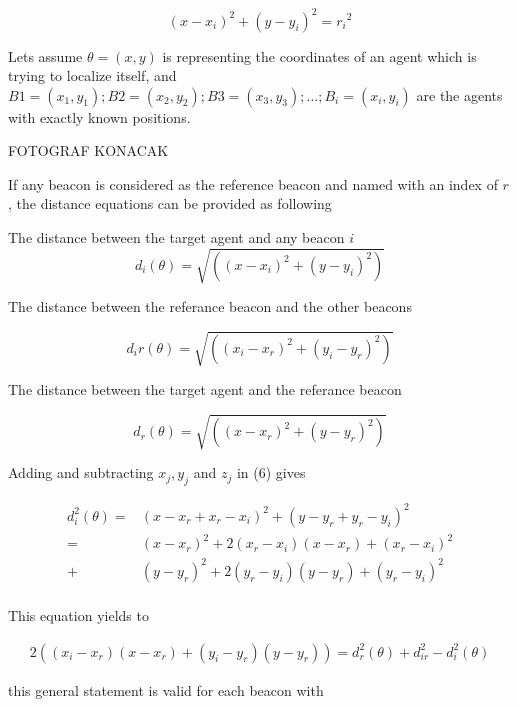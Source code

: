 \documentclass[twoside]{article}
\begin{document}
\begin{equation}
  (x-x_i)^2 + (y - y_i)^2 = {r_i}^2
\end{equation}

Lets assume $\theta = (x,y)$ is representing the coordinates of an agent which is trying to localize itself, and $B1 = (x_1,y_1) ; B2 = (x_2,y_2) ; B3 = (x_3,y_3) ; ...  ; B_i = (x_i,y_i)$ are the agents with exactly known positions. 


FOTOGRAF KONACAK

If any beacon is considered as the reference beacon and named with an index of $r$, the distance equations can be provided as following 

The distance between the target agent and any beacon $i$
\begin{equation}
  d_i(\theta) = \sqrt{\left((x - x_i)^2 + (y - y_i)^2\right)}
\end{equation}

The distance between the referance beacon and the other beacons

\begin{equation}
d_ir(\theta) = \sqrt{\left((x_i - x_r)^2 + (y_i - y_r)^2\right)}
\end{equation}

The distance between the target agent and the referance beacon

\begin{equation}
d_r(\theta) = \sqrt{\left((x - x_r)^2 + (y - y_r)^2\right)}
\end{equation}

Adding and subtracting $x_j, y_j$ and $z_j$ in (6) gives

\begin{align*}
d_i^2(\theta) = & (x - x_r + x_r - x_i)^2 + (y - y_r + y_r - y_i)^2 \\
              = & (x - x_r)^2 + 2(x_r - x_i)(x - x_r) + (x_r-x_i)^2 \\ 
              + & (y - y_r)^2 + 2(y_r - y_i)(y - y_r) + (y_r - y_i)^2 \\               
\end{align*}


This equation yields to

\begin{align*}
 2((x_i - x_r)(x - x_r) + (y_i - y_r)(y - y_r)) = d_r^2(\theta) + d_{ir}^2 - d_i^2(\theta)
\end{align*}

this general statement is valid for each beacon with
\end{document}
